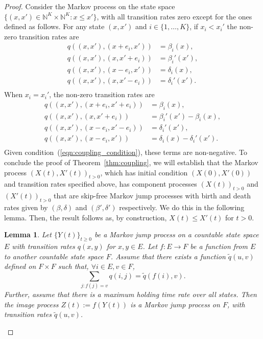 \documentclass[11pt]{article}
\newtheorem{lemma}[theorem]{Lemma}
\begin{document}
\begin{proof}
Consider the Markov process on the state space $\{(x,x')\in \mathbb{N}^K \times \mathbb{N}^K: x\leq x'\}$, with all transition rates zero except for the ones defined as follows. For any state $(x,x')$ and $i\in\{1,\ldots,K\}$, if $x_i < x_i'$ the non-zero transition rates are
$$\begin{aligned}
q((x,x'),(x+e_i,x')) &= \beta_i(x),\\
q((x,x'),(x,x'+e_i)) &= \beta_i'(x'),\\
q((x,x'),(x-e_i,x')) &= \delta_i(x),\\
q((x,x'),(x,x'-e_i)) &= \delta_i'(x').\\
\end{aligned}$$
When $x_i=x_i'$, the non-zero transition rates are
$$\begin{aligned}
q((x,x'),(x+e_i,x'+e_i)) &= \beta_i(x),\\
q((x,x'),(x,x'+e_i)) &= \beta_i'(x') - \beta_i(x),\\
q((x,x'),(x-e_i,x'-e_i)) &= \delta_i'(x'),\\
q((x,x'),(x-e_i,x')) &= \delta_i(x) - \delta_i'(x').\\
\end{aligned}$$
Given condition~(\ref{eqn:coupling_condition}), these terms are non-negative. To conclude the proof of Theorem~\ref{thm:coupling}, we will establish that the Markov process $(X(t),X'(t))_{t>0}$, which has initial condition $(X(0),X'(0))$ and transition rates specified above, has component processes $(X(t))_{t>0}$ and $(X'(t))_{t>0}$ that are skip-free Markov jump processes with birth and death rates given by $(\beta,\delta)$ and $(\beta',\delta')$ respectively. We do this in the following lemma. Then, the result follows as, by construction, $X(t) \leq X'(t)$ for $t>0$.

\begin{lemma} \label{lemma:coupling}
Let $\{Y(t)\}_{t\geq 0}$ be a Markov jump process on a countable state space $E$ with transition rates $q(x,y)$ for $x,y\in E$. Let $f:E\rightarrow F$ be a function from $E$ to another countable state space $F$. Assume that there exists a function $\tilde q(u,v)$ defined on $F\times F$ such that, $\forall i\in E, v\in F$, 
$$\sum_{j:f(j)=v} q(i,j) = \tilde q(f(i),v).$$
Further, assume that there is a maximum holding time rate over all states.
Then the image process $Z(t):= f(Y(t))$ is a Markov jump process on $F$, with transition rates $\tilde q(u,v)$.
\end{lemma}


\end{proof}
\end{document}
